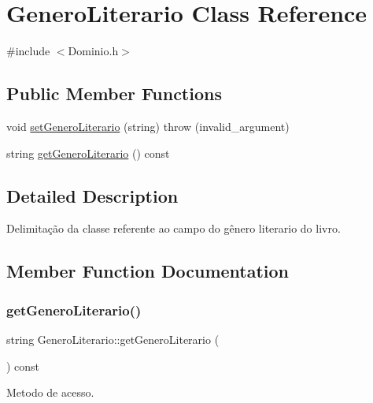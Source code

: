 \hypertarget{class_genero_literario}{}\section{Genero\+Literario Class Reference}
\label{class_genero_literario}


{\ttfamily \#include $<$Dominio.\+h$>$}

\subsection*{Public Member Functions}
\begin{DoxyCompactItemize}
\item 
void \hyperlink{class_genero_literario_a8f1e5b219c4543ccb4ab4edd783f0448}{set\+Genero\+Literario} (string)  throw (invalid\+\_\+argument)
\item 
string \hyperlink{class_genero_literario_ac5f4c839675166d1cab6c848d4d0909d}{get\+Genero\+Literario} () const
\end{DoxyCompactItemize}


\subsection{Detailed Description}
Delimitação da classe referente ao campo do gênero literario do livro. 

\subsection{Member Function Documentation}
\mbox{\label{class_genero_literario_ac5f4c839675166d1cab6c848d4d0909d}} 
\subsubsection{\texorpdfstring{get\+Genero\+Literario()}{getGeneroLiterario()}}
{\footnotesize\ttfamily string Genero\+Literario\+::get\+Genero\+Literario (\begin{DoxyParamCaption}{ }\end{DoxyParamCaption}) const\hspace{0.3cm}{\ttfamily [inline]}}

Metodo de acesso. \mbox{\label{class_genero_literario_a8f1e5b219c4543ccb4ab4edd783f0448}} 
